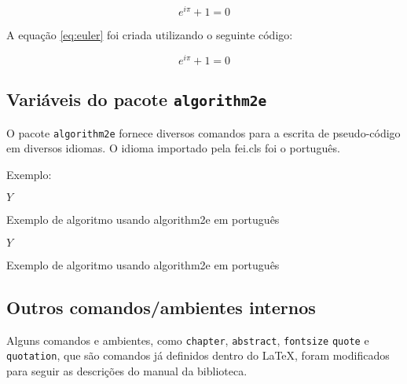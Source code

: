 \documentclass{fei}
\begin{document}
	\begin{equation} \label{eq:euler}
	e^{i\pi}+1=0
	\end{equation}
	
	A equação \eqref{eq:euler} foi criada utilizando o seguinte código:
	
	\begin{latexcode}
	\begin{equation} \label{eq:euler}
	e^{i\pi}+1=0
	\end{equation}	
	\end{latexcode}
    
    \subsection{Variáveis do pacote \texttt{algorithm2e}}
    
    O pacote \texttt{algorithm2e} fornece diversos comandos para a escrita de pseudo-código em diversos idiomas. O idioma importado pela fei.cls foi o português.
    
    Exemplo:

\begin{latexcode}
\begin{algorithm}
	\Retorna \(Y\)
	\caption{Exemplo de algoritmo usando algorithm2e em português}
	\label{lst:alg}
\end{algorithm}
\end{latexcode}
    
\begin{algorithm}


\Retorna \(Y\)

\caption{Exemplo de algoritmo usando algorithm2e em português}
\label{lst:alg}
\end{algorithm}
    
    \subsection{Outros comandos/ambientes internos}
    
    Alguns comandos e ambientes, como \texttt{chapter}, \texttt{abstract}, \texttt{fontsize} \texttt{quote} e \texttt{quotation}, que são comandos já definidos dentro do \LaTeX, foram modificados para seguir as descrições do manual da biblioteca.
\end{document}
